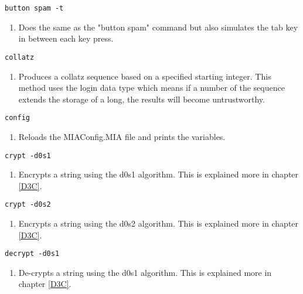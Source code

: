 \index{}
\begin{lstlisting} 
button spam -t
\end{lstlisting}
\begin{enumerate}
	\item[] Does the same as the "button spam" command but also simulates the tab key in between each key press.
\end{enumerate}

\begin{lstlisting} 
collatz   
\end{lstlisting}
\begin{enumerate}
	\item[] Produces a collatz sequence based on a specified starting integer. This method uses the login data type which means if a number of the sequence extends the storage of a long, the results will become untrustworthy. 
\end{enumerate}
\begin{lstlisting} 
config 
\end{lstlisting}
\begin{enumerate}
	\item[] Reloads the MIAConfig.MIA file and prints the variables.
\end{enumerate}

\begin{lstlisting} 
crypt -d0s1   
\end{lstlisting}
\begin{enumerate}
	\item[] Encrypts a string using the d0s1 algorithm. This is explained more in chapter \ref{D3C}.
\end{enumerate}

\begin{lstlisting} 
crypt -d0s2  
\end{lstlisting}
\begin{enumerate}
	\item[] Encrypts a string using the d0s2 algorithm. This is explained more in chapter \ref{D3C}.
\end{enumerate}

\begin{lstlisting} 
decrypt -d0s1   
\end{lstlisting}
\begin{enumerate}
	\item[] De-crypts a string using the d0s1 algorithm. This is explained more in chapter \ref{D3C}.
\end{enumerate}



